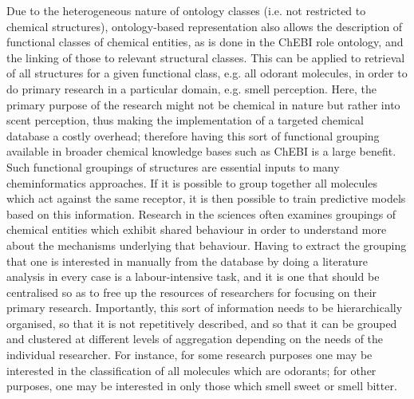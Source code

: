 \documentclass[10pt]{bmc_article}
\newenvironment{bmcformat}{\baselineskip20pt\sloppy\setboolean{publ}{false}}{\baselineskip20pt\sloppy}
\begin{document}
\begin{bmcformat}
Due to the heterogeneous nature of ontology classes (i.e. not restricted to chemical structures), ontology-based representation also allows the description of functional classes of chemical entities, as is done in the ChEBI role ontology, and the linking of those to relevant structural classes.  
This can be applied to retrieval of all structures for a given functional class, e.g. all odorant molecules, in order to do primary research in a particular domain, e.g. smell perception. Here, the primary purpose of the research might not be chemical in nature but rather into scent perception, thus making the implementation of a targeted chemical database a costly overhead; therefore having this sort of functional grouping available in broader chemical knowledge bases such as ChEBI is a large benefit.
Such functional groupings of structures are essential inputs to many cheminformatics approaches.  If it is possible to group together all molecules which act against the same receptor, it is then possible to train predictive models based on this information.   %
Research in the sciences often examines groupings of chemical entities which exhibit shared behaviour in order to understand more about the mechanisms underlying that behaviour. 
Having to extract the grouping that one is interested in manually from the database by doing a literature analysis in every case is a labour-intensive task, and it is one that should be centralised so as to free up the resources of researchers for focusing on their primary research. 
Importantly, this sort of information needs to be hierarchically organised, so that it is not repetitively described, and so that it can be grouped and clustered at different levels of aggregation depending on the needs of the individual researcher. For instance, for some research purposes one may be interested in the classification of all molecules which are odorants; for other purposes, one may be interested in only those which smell sweet or smell bitter. 



\end{bmcformat}
\end{document}
